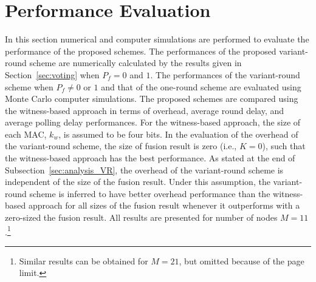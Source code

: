 \documentclass[12pt, onecolumn, draftcls]{IEEEtran}
\begin{document}
\section{Performance Evaluation}
\label{sec:performance} In this section numerical and computer
simulations are performed to evaluate the performance of the
proposed schemes. The performances of the proposed variant-round
scheme are numerically calculated by the results given in
Section~\ref{sec:voting} when $P_f=0$ and $1$. The performances of
the variant-round scheme when $P_f\neq 0$ or $1$ and that of the
one-round scheme are evaluated using Monte Carlo computer
simulations. The proposed schemes are compared using the
witness-based approach in terms of overhead, average round delay,
and average polling delay performances. For the witness-based
approach, the size of each MAC, $k_w$, is assumed to be four bits.
In the evaluation of the overhead of the variant-round scheme, the
size of fusion result is zero (i.e., $K=0$), such that the
witness-based approach has the best performance. As stated at the
end of Subsection~\ref{sec:analysis_VR}, the overhead of the
variant-round scheme is independent of the size of the fusion
result. Under this assumption, the variant-round scheme is inferred
to have better overhead performance than the witness-based approach
for all sizes of the fusion result whenever it outperforms with a
zero-sized the fusion result. All results are presented for number
of nodes $M=11$.\footnote{Similar results can be obtained for
$M=21$, but omitted because of the page limit.}
\end{document}
